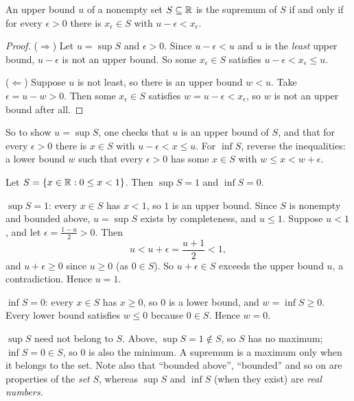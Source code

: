 \begin{nlemma}\label{lem:eps-sup}
  An upper bound $u$ of a nonempty set $S \subseteq \mathbb{R}$ is the supremum of
  $S$ if and only if for every $\epsilon > 0$ there is $x_\epsilon \in S$
  with $u - \epsilon < x_\epsilon$.
\end{nlemma}

\begin{proof}
  ($\Rightarrow$) Let $u = \sup S$ and $\epsilon > 0$. Since
  $u - \epsilon < u$ and $u$ is the \emph{least} upper bound, $u - \epsilon$
  is not an upper bound. So some $x_\epsilon \in S$ satisfies
  $u - \epsilon < x_\epsilon \leq u$.

  ($\Leftarrow$) Suppose $u$ is not least, so there is an upper bound
  $w < u$. Take $\epsilon = u - w > 0$. Then some $x_\epsilon \in S$
  satisfies $w = u - \epsilon < x_\epsilon$, so $w$ is not an upper bound
  after all.
\end{proof}

So to show $u = \sup S$, one checks that $u$ is an upper bound of $S$, and
that for every $\epsilon > 0$ there is $x \in S$ with $u - \epsilon < x \leq u$.
For $\inf S$, reverse the inequalities: a lower bound $w$ such that every
$\epsilon > 0$ has some $x \in S$ with $w \leq x < w + \epsilon$.

\begin{eg}
  Let $S = \{x \in \mathbb{R} : 0 \leq x < 1\}$. Then $\sup S = 1$ and $\inf S = 0$.

  \emph{$\sup S = 1$}: every $x \in S$ has $x < 1$, so $1$ is an upper bound.
  Since $S$ is nonempty and bounded above, $u = \sup S$ exists by
  completeness, and $u \leq 1$. Suppose $u < 1$, and let
  $\epsilon = \frac{1 - u}{2} > 0$. Then
  \[
    u < u + \epsilon = \frac{u + 1}{2} < 1,
  \]
  and $u + \epsilon \geq 0$ since $u \geq 0$ (as $0 \in S$). So
  $u + \epsilon \in S$ exceeds the upper bound $u$, a contradiction. Hence
  $u = 1$.

  \emph{$\inf S = 0$}: every $x \in S$ has $x \geq 0$, so $0$ is a lower
  bound, and $w = \inf S \geq 0$. Every lower bound satisfies $w \leq 0$
  because $0 \in S$. Hence $w = 0$.
\end{eg}

\begin{warning}
  $\sup S$ need not belong to $S$. Above, $\sup S = 1 \notin S$, so $S$ has
  no maximum; $\inf S = 0 \in S$, so $0$ is also the minimum. A supremum is a
  maximum only when it belongs to the set. Note also that ``bounded above'',
  ``bounded'' and so on are properties of the \emph{set} $S$, whereas
  $\sup S$ and $\inf S$ (when they exist) are \emph{real numbers}.
\end{warning}
